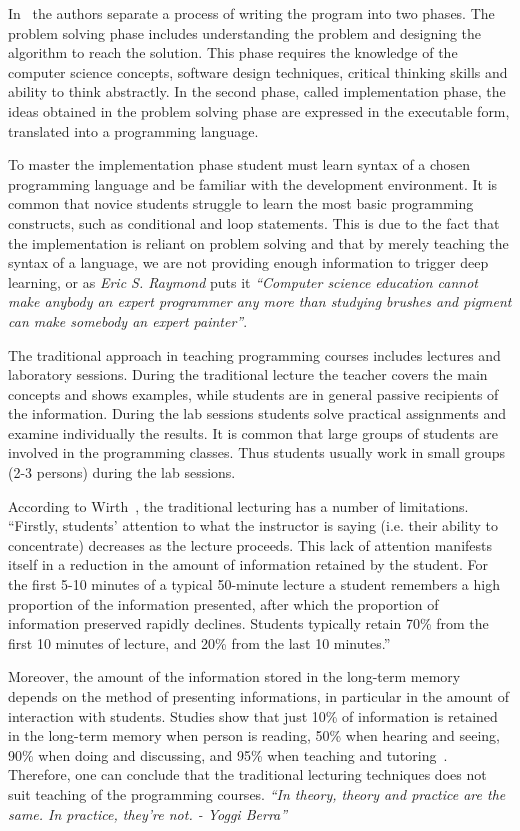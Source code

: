 \documentclass{article}
\begin{document}
In~\cite{state_of_art} the authors separate a process of writing the program
into two phases. The problem solving phase includes understanding the problem
and designing the algorithm to reach the solution. This phase requires the
knowledge of the computer science concepts, software design techniques, critical
thinking skills and ability to think abstractly. In the second phase, called
implementation phase, the ideas obtained in the problem solving phase are
expressed in the executable form, translated into a programming language.

To master the implementation phase student must learn syntax of a chosen
programming language and be familiar with the development environment. It is
common that novice students struggle to learn the most basic programming
constructs, such as conditional and loop statements. This is due to the fact
that the implementation is reliant on problem solving and that by merely
teaching the syntax of a language, we are not providing enough information to
trigger deep learning, or as \emph{Eric S. Raymond} puts it 
\emph{``Computer science education cannot make anybody an expert programmer any
more than studying brushes and pigment can make somebody an expert painter''}. 

The traditional approach in teaching programming courses includes lectures and
laboratory sessions. During the traditional lecture the teacher covers the
main concepts and shows examples, while students are in general passive
recipients of the information. During the lab sessions students solve practical
assignments and examine individually the results. It is common that large groups
of students are involved in the programming classes. Thus students usually work
in small groups (2-3 persons) during the lab sessions. 

According to Wirth~\cite{wirth}, the traditional lecturing has a number of
limitations.  ``Firstly, students’ attention to what the instructor is saying
(i.e. their ability to concentrate) decreases as the lecture proceeds. This lack
of attention manifests itself in a reduction in the amount of information
retained by the student. For the first 5-10 minutes of a typical 50-minute
lecture a student remembers a high proportion of the information presented,
after which the proportion of information preserved rapidly declines. Students
typically retain 70\% from the first 10 minutes of lecture, and 20\% from the
last 10 minutes.''

Moreover, the amount of the information stored in the long-term memory depends
on the method of presenting informations, in particular in the amount of
interaction with students.  Studies show that just 10\% of information  is
retained in the long-term memory when person is reading, 50\% when hearing and
seeing, 90\% when doing and discussing, and 95\% when teaching and
tutoring~\cite{magnesen}. Therefore, one can conclude that the traditional
lecturing techniques does not suit teaching of the programming courses.
\emph{``In theory, theory and practice are the same. In practice,
they’re not. - Yoggi Berra'' }
\end{document}
